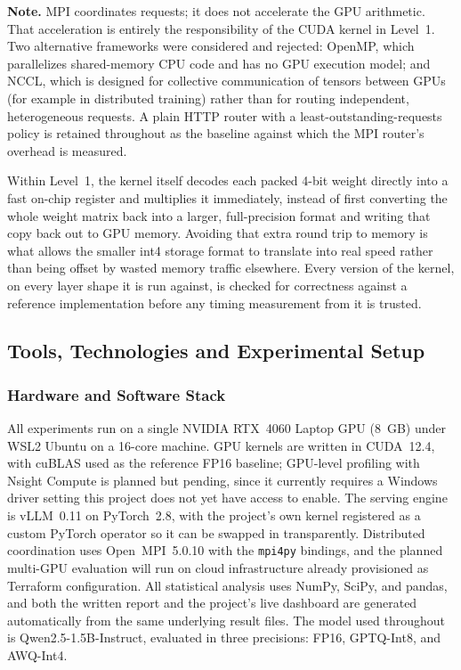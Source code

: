 \documentclass[11pt,a4paper]{article}
\begin{document}
\noindent\textbf{Note.} MPI coordinates requests; it does not accelerate the GPU arithmetic. That acceleration is
entirely the responsibility of the CUDA kernel in Level~1. Two alternative frameworks were considered and rejected:
OpenMP, which parallelizes shared-memory CPU code and has no GPU execution model; and NCCL, which is designed for
collective communication of tensors between GPUs (for example in distributed training) rather than for routing
independent, heterogeneous requests. A plain HTTP router with a least-outstanding-requests policy is retained
throughout as the baseline against which the MPI router's overhead is measured.

Within Level~1, the kernel itself decodes each packed 4-bit weight directly into a fast on-chip register and
multiplies it immediately, instead of first converting the whole weight matrix back into a larger, full-precision
format and writing that copy back out to GPU memory. Avoiding that extra round trip to memory is what allows the
smaller int4 storage format to translate into real speed rather than being offset by wasted memory traffic
elsewhere. Every version of the kernel, on every layer shape it is run against, is checked for correctness against a
reference implementation before any timing measurement from it is trusted.

\subsection{Tools, Technologies and Experimental Setup}
\label{sec:rigor}

\subsubsection*{Hardware and Software Stack}
All experiments run on a single NVIDIA RTX~4060 Laptop GPU (8~GB) under WSL2 Ubuntu on a 16-core machine. GPU kernels
are written in CUDA~12.4, with cuBLAS used as the reference FP16 baseline; GPU-level profiling with Nsight Compute is
planned but pending, since it currently requires a Windows driver setting this project does not yet have access to
enable. The serving engine is vLLM~0.11 on PyTorch~2.8, with the project's own kernel registered as a custom
PyTorch operator so it can be swapped in transparently. Distributed coordination uses Open~MPI~5.0.10 with the
\texttt{mpi4py} bindings, and the planned multi-GPU evaluation will run on cloud infrastructure already provisioned
as Terraform configuration. All statistical analysis uses NumPy, SciPy, and pandas, and both the written report and
the project's live dashboard are generated automatically from the same underlying result files. The model used
throughout is Qwen2.5-1.5B-Instruct, evaluated in three precisions: FP16, GPTQ-Int8, and AWQ-Int4.
\end{document}
